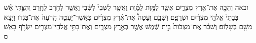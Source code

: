\documentclass{openreader}
\begin{document}
ובאה וְהִכָּ֖ה אֶת־אֶ֣רֶץ מִצְרָ֑יִם אֲשֶׁ֧ר לַמָּ֣וֶת לַמָּ֗וֶת וַאֲשֶׁ֤ר לַשְּׁבִי֙ לַשֶּׁ֔בִי וַאֲשֶׁ֥ר לַחֶ֖רֶב לֶחָֽרֶב׃ 
וְהִצַּ֣תִּי אֵ֗שׁ בְּבָתֵּי֙ אֱלֹהֵ֣י מִצְרַ֔יִם וּשְׂרָפָ֖ם וְשָׁבָ֑ם וְעָטָה֩ אֶת־אֶ֨רֶץ מִצְרַ֜יִם כַּאֲשֶׁר־יַעְטֶ֤ה הָֽרֹעֶה֙ אֶת־בִּגְדֹ֔ו וְיָצָ֥א מִשָּׁ֖ם בְּשָׁלֹֽום׃ 
וְשִׁבַּ֗ר אֶֽת־מַצְּבֹות֙ בֵּ֣ית שֶׁ֔מֶשׁ אֲשֶׁ֖ר בְּאֶ֣רֶץ מִצְרָ֑יִם וְאֶת־בָּתֵּ֥י אֱלֹהֵֽי־מִצְרַ֖יִם יִשְׂרֹ֥ף בָּאֵֽשׁ׃ ס 
\end{document}
